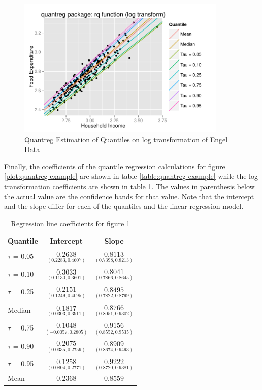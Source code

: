 \documentclass[12pt,a4paper]{report}
\begin{document}
\begin{figure}[ht]\centering
    \includegraphics[width=10cm]{PlotofQuantregLog.pdf}
    \caption{Quantreg Estimation of Quantiles on log transformation of Engel Data}
    \label{plot:quantreglog-example}
\end{figure}

Finally, the coefficients of the quantile regression calculations for figure \ref{plot:quantreg-example} are shown in table \ref{table:quantreg-example} while the log transformation coefficients are shown in table \ref{table:quantreglog-example}. The values in parenthesis below the actual value are the confidence bands for that value. Note that the intercept and the slope differ for each of the quantiles and the linear regression model.
\vspace{2mm}

\begin{table}[ht]
\begin{center}
\begin{tabular}{|l||c|c|} \hline
\multicolumn{1}{|l||}{Quantile}&\multicolumn{1}{c|}{Intercept}&\multicolumn{1}{c|}{Slope}\tabularnewline
\hline
$\tau$ = 0.05&$\underset{(0.2283,0.4607)}{0.2638}$&$\underset{(0.7398,0.8213)}{0.8113}$\tabularnewline
$\tau$ = 0.10&$\underset{(0.1130,0.3601)}{0.3033}$&$\underset{(0.7866,0.8645)}{0.8041}$\tabularnewline
$\tau$ = 0.25&$\underset{(0.1249,0.4095)}{0.2151}$&$\underset{(0.7822,0.8799)}{0.8495}$\tabularnewline
Median&$\underset{(0.0303,0.3911)}{0.1817}$&$\underset{(0.8051,0.9302)}{0.8766}$\tabularnewline
$\tau$ = 0.75&$\underset{(-0.0057,0.2805)}{0.1048}$&$\underset{(0.8552,0.9535)}{0.9156}$\tabularnewline
$\tau$ = 0.90&$\underset{(0.0335,0.2759)}{0.2075}$&$\underset{(0.8674,0.9493)}{0.8909}$\tabularnewline
$\tau$ = 0.95&$\underset{(0.0804,0.2771)}{0.1258}$&$\underset{(0.8720,0.9381)}{0.9222}$\tabularnewline
Mean&$0.2368$&$0.8559$\tabularnewline
\hline
\end{tabular}
\end{center}
\caption{Regression line coefficients for figure \ref{plot:quantreglog-example}}
\label{table:quantreglog-example}
\end{table}
\end{document}
